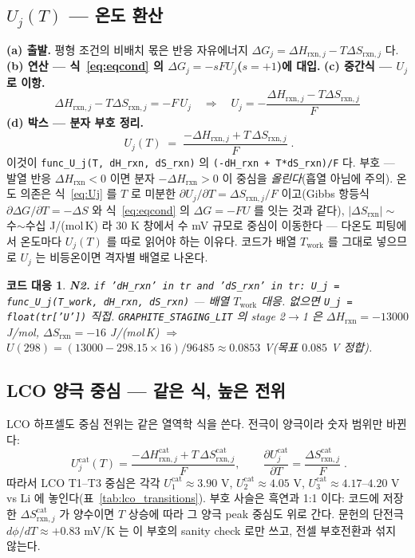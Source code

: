 \documentclass[11pt,a4paper]{article}
\newtheorem*{codebox}{코드 대응}
\newcommand{\rxn}{\mathrm{rxn}}
\newcommand{\cat}{\mathrm{cat}}
\newcommand{\work}{\mathrm{work}}
\newcommand{\code}[1]{\texttt{#1}}
\begin{document}
\subsection{$U_j(T)$ — 온도 환산}
\textbf{(a) 출발.} 평형 조건의 비배치 몫은 반응 자유에너지 $\Delta G_j=\Delta H_{\rxn,j}-T\Delta S_{\rxn,j}$ 다.
\textbf{(b) 연산 — 식~\eqref{eq:eqcond} 의 $\Delta G_j=-sFU_j$($s=+1$)에 대입.} \textbf{(c) 중간식 — $U_j$ 로 이항.}
\begin{equation}
\Delta H_{\rxn,j}-T\Delta S_{\rxn,j}=-F\,U_j
\quad\Longrightarrow\quad
U_j=-\frac{\Delta H_{\rxn,j}-T\Delta S_{\rxn,j}}{F}
\label{eq:Ujmid}
\end{equation}
\textbf{(d) 박스 — 분자 부호 정리.}
\begin{equation}
\boxed{\;U_j(T)\;=\;\frac{-\Delta H_{\rxn,j}+T\,\Delta S_{\rxn,j}}{F}\;.}
\label{eq:Uj}
\end{equation}
이것이 \code{func\_U\_j(T, dH\_rxn, dS\_rxn)} 의 \code{(-dH\_rxn + T*dS\_rxn)/F} 다. 부호 — 발열 반응
$\Delta H_\rxn<0$ 이면 분자 $-\Delta H_\rxn>0$ 이 중심을 \emph{올린다}(흡열 아님에 주의). 온도 의존은 식~\eqref{eq:Uj} 를
$T$ 로 미분한 $\partial U_j/\partial T=\Delta S_{\rxn,j}/F$ 이고(Gibbs 항등식 $\partial\Delta G/\partial T=-\Delta S$ 와
식~\eqref{eq:eqcond} 의 $\Delta G=-FU$ 를 잇는 것과 같다), $|\Delta S_\rxn|\sim$ 수$\sim$수십 J/(mol\,K) 라 $30$ K
창에서 수 mV 규모로 중심이 이동한다 — 다온도 피팅에서 온도마다 $U_j(T)$ 를 따로 읽어야 하는 이유다. 코드가 배열
$T_\work$ 를 그대로 넣으므로 $U_j$ 는 비등온이면 격자별 배열로 나온다.

\begin{codebox}
\textbf{N2.} \code{if 'dH\_rxn' in tr and 'dS\_rxn' in tr: U\_j = func\_U\_j(T\_work, dH\_rxn, dS\_rxn)}
— 배열 $T_\work$ 대응. 없으면 \code{U\_j = float(tr['U'])} 직접. \code{GRAPHITE\_STAGING\_LIT} 의 stage 2$\to$1 은
$\Delta H_\rxn=-13000$ J/mol, $\Delta S_\rxn=-16$ J/(mol\,K) $\Rightarrow$ $U(298)=(13000-298.15\times16)/96485
\approx0.0853$ V(목표 $0.085$ V 정합).
\end{codebox}

\subsection{LCO 양극 중심 — 같은 식, 높은 전위}
LCO 하프셀도 중심 전위는 같은 열역학 식을 쓴다. 전극이 양극이라 숫자 범위만 바뀐다:
\begin{equation}
\boxed{\;U_j^\cat(T)=\frac{-\Delta H_{\rxn,j}^\cat+T\,\Delta S_{\rxn,j}^\cat}{F},\qquad
\frac{\partial U_j^\cat}{\partial T}=\frac{\Delta S_{\rxn,j}^\cat}{F}\;.}
\label{eq:Ujcat}
\end{equation}
따라서 LCO T1--T3 중심은 각각 $U_1^\cat\approx3.90$ V, $U_2^\cat\approx4.05$ V,
$U_3^\cat\approx4.17$--$4.20$ V vs Li 에 놓인다(표~\ref{tab:lco_transitions}). 부호 사슬은 흑연과 1:1 이다:
코드에 저장한 $\Delta S_{\rxn,j}^\cat$ 가 양수이면 $T$ 상승에 따라 그 양극 peak 중심도 위로 간다. 문헌의
단전극 $d\phi/dT\approx+0.83$ mV/K 는 이 부호의 sanity check 로만 쓰고, 전셀 부호전환과 섞지 않는다.
\end{document}
